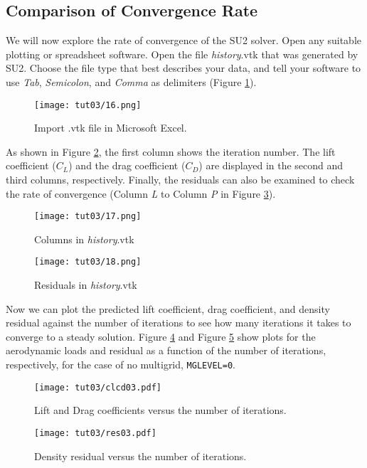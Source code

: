 \subsection{Comparison of Convergence Rate}
We will now explore the rate of convergence of the SU2 solver. Open any suitable plotting or spreadsheet software. Open the file \textit{history}.vtk that was generated by SU2. Choose the file type that best describes your data, and tell your software to use \textit{Tab}, \textit{Semicolon}, and \textit{Comma} as delimiters (Figure \ref{fig3:importvtkxlxs}).
\begin{figure}[htbp]
    \centering
    \texttt{[image: tut03/16.png]}
    \caption{Import .vtk file in Microsoft Excel.}
    \label{fig3:importvtkxlxs}
\end{figure}
As shown in Figure \ref{fig3:columnsxlxs}, the first column shows the iteration number. The lift coefficient ($C_L$) and the drag coefficient ($C_D$) are displayed in the second and third columns, respectively. Finally, the residuals can also be examined to check the rate of convergence (Column \textit{L} to Column \textit{P} in Figure \ref{fig3:residualxlxs}).
\begin{figure}[htbp]
    \centering
    \texttt{[image: tut03/17.png]}
    \caption{Columns in \textit{history}.vtk}
    \label{fig3:columnsxlxs}
\end{figure}
\begin{figure}[htbp]
    \centering
    \texttt{[image: tut03/18.png]}
    \caption{Residuals in \textit{history}.vtk}
    \label{fig3:residualxlxs}
\end{figure}
Now we can plot the predicted lift coefficient, drag coefficient, and density residual against the number of iterations to see how many iterations it takes to converge to a steady solution. Figure \ref{fig3:clcdxlxs} and Figure \ref{fig3:res_vs_itr} show plots for the aerodynamic loads and residual as a function of the number of iterations, respectively, for the case of no multigrid, \texttt{MGLEVEL=0}.
\begin{figure}[htbp]
    \centering
    \texttt{[image: tut03/clcd03.pdf]}
    \caption{Lift and Drag coefficients versus the number of iterations.}
    \label{fig3:clcdxlxs}
\end{figure}
\begin{figure}[htbp]
    \centering
    \texttt{[image: tut03/res03.pdf]}
    \caption{Density residual versus the number of iterations.}
    \label{fig3:res_vs_itr}
\end{figure}
